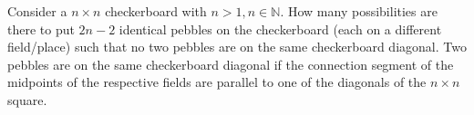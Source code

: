 Consider a $ n \times n$ checkerboard with $ n > 1, n \in \mathbb{N}.$ How many possibilities are there to put $ 2n - 2$ identical pebbles on the checkerboard (each on a different field/place) such that no two pebbles are on the same checkerboard diagonal. Two pebbles are on the same checkerboard diagonal if the connection segment of the midpoints of the respective fields are parallel to one of the diagonals of the $ n \times n$ square.